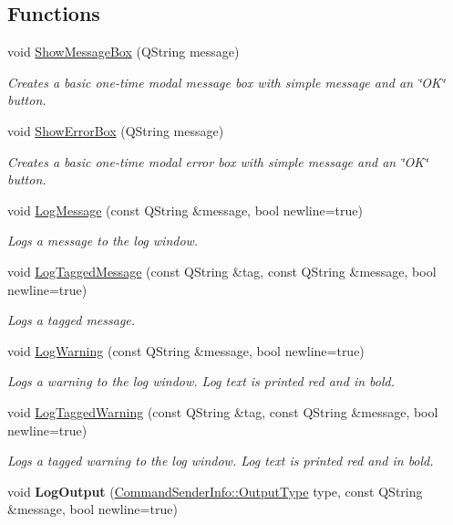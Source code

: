 \subsection*{Functions}
\begin{DoxyCompactItemize}
\item 
void \hyperlink{group___global_variables_ga9551f73a6927861d0b6f5d7901c90888}{Show\-Message\-Box} (Q\-String message)
\begin{DoxyCompactList}\small\item\em Creates a basic one-\/time modal message box with simple message and an \char`\"{}\-O\-K\char`\"{} button. \end{DoxyCompactList}\item 
void \hyperlink{group___global_variables_gadf8a13f3d23660f424828d7f559addd3}{Show\-Error\-Box} (Q\-String message)
\begin{DoxyCompactList}\small\item\em Creates a basic one-\/time modal error box with simple message and an \char`\"{}\-O\-K\char`\"{} button. \end{DoxyCompactList}\item 
void \hyperlink{group___global_variables_ga1788dc69b89b298a038015cbb83f8183}{Log\-Message} (const Q\-String \&message, bool newline=true)
\begin{DoxyCompactList}\small\item\em Logs a message to the log window. \end{DoxyCompactList}\item 
void \hyperlink{group___global_variables_gacb9fa8876388ad9319c61d9ae4d21510}{Log\-Tagged\-Message} (const Q\-String \&tag, const Q\-String \&message, bool newline=true)
\begin{DoxyCompactList}\small\item\em Logs a tagged message. \end{DoxyCompactList}\item 
void \hyperlink{group___global_variables_ga4b2863ab23932e06f2b5f292c66e7ef6}{Log\-Warning} (const Q\-String \&message, bool newline=true)
\begin{DoxyCompactList}\small\item\em Logs a warning to the log window. Log text is printed red and in bold. \end{DoxyCompactList}\item 
void \hyperlink{group___global_variables_ga49e471be032d9340fe6b4c251d1aef21}{Log\-Tagged\-Warning} (const Q\-String \&tag, const Q\-String \&message, bool newline=true)
\begin{DoxyCompactList}\small\item\em Logs a tagged warning to the log window. Log text is printed red and in bold. \end{DoxyCompactList}\item 
\hypertarget{group___global_variables_gab9e5c16962c3cdcd7220de6dfa5a70b5}{void {\bfseries Log\-Output} (\hyperlink{class_command_sender_info_a3a5e6a2ef1772f6557f351652c2e3b60}{Command\-Sender\-Info\-::\-Output\-Type} type, const Q\-String \&message, bool newline=true)}\label{group___global_variables_gab9e5c16962c3cdcd7220de6dfa5a70b5}


\end{DoxyCompactItemize}

